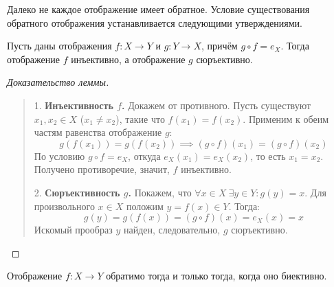 \begin{remark}
    Далеко не каждое отображение имеет обратное. Условие существования 
    обратного отображения устанавливается следующими утверждениями.
\end{remark}

\begin{lemma} \label{lem:inv_inj_surj}
    Пусть даны отображения $f: X \to Y$ и $g: Y \to X$, причём 
    $g \circ f = e_X$. Тогда отображение $f$ инъективно, а отображение $g$ 
    сюръективно.
\end{lemma}

\begin{proof}[Доказательство леммы]~\\
    \begin{quote}
        1. \textbf{Инъективность $f$.} Докажем от противного. Пусть 
        существуют $x_1, x_2 \in X$ ($x_1 \neq x_2$), такие что 
        $f(x_1) = f(x_2)$. Применим к обеим частям равенства отображение $g$:
        \[
            g(f(x_1)) = g(f(x_2)) \implies 
            (g \circ f)(x_1) = (g \circ f)(x_2)
        \]
        По условию $g \circ f = e_X$, откуда $e_X(x_1) = e_X(x_2)$, то есть 
        $x_1 = x_2$. Получено противоречие, значит, $f$ инъективно.

        2. \textbf{Сюръективность $g$.} Покажем, что 
        $\forall x \in X \ \exists y \in Y : g(y) = x$. Для произвольного 
        $x \in X$ положим $y = f(x) \in Y$. Тогда:
        \[
            g(y) = g(f(x)) = (g \circ f)(x) = e_X(x) = x
        \]
        Искомый прообраз $y$ найден, следовательно, $g$ сюръективно.
    \end{quote}
\end{proof}

\begin{theorem}
    Отображение $f: X \to Y$ обратимо тогда и только тогда, когда оно 
    биективно.
\end{theorem}

